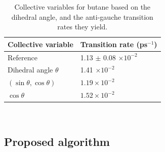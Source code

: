 \documentclass[reqno, 12pt]{article}
\begin{document}
\begin{table}[h!]
\begin{center}
\begin{tabular}{ll}
\toprule
Collective variable          & Transition rate (ps$^{-1}$)    \\
\midrule
Reference                    & 1.13 $\pm$ 0.08 $\times 10^{-2}$ \\
Dihedral angle $\theta$      & 1.41 $\times 10^{-2}$               \\
$(\sin \theta, \cos \theta)$ & $1.19 \times 10^{-2}$            \\
$\cos \theta$                & $1.52 \times 10^{-2}$             \\ 
\bottomrule
\end{tabular} \\

\caption{Collective variables for butane based on the dihedral angle, and the anti-gauche transition rates they yield.}
\label{tab: RatesTheta}

\end{center}
\end{table}


\subsection{Proposed algorithm} 
\end{document}
